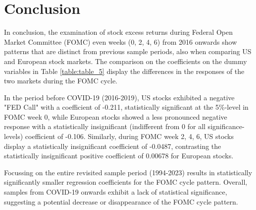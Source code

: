 

%

\chapter{Conclusion}
In conclusion, the examination of stock excess returns during Federal Open Market Committee (FOMC) even weeks (0, 2, 4, 6) from 2016 onwards show patterns that are distinct from previous sample periods, also when comparing US and European stock markets. The comparison on the coefficients on the dummy variables in Table \ref{table:table_5} display the differences in the responses of the two markets during the FOMC cycle.  

In the period before COVID-19 (2016-2019),  US stocks exhibited a negative "FED Call" with a coefficient of -0.211, statistically significant at the 5\%-level in FOMC week 0, while European stocks showed a less pronounced negative response with a statistically insignificant (indifferent from 0 for all significance-levels) coefficient of -0.106. Similarly, during FOMC week 2, 4, 6, US stocks display a statistically insignificant coefficient of -0.0487,  contrasting the statistically insignificant positive coefficient of 0.00678 for European stocks. 

Focussing on the entire revisited sample period (1994-2023) results in statistically significantly smaller regression coefficients for the FOMC cycle pattern.  Overall, samples from COVID-19 onwards exhibit a lack of statistical significance,  suggesting a potential decrease or disappearance of the FOMC cycle pattern.




